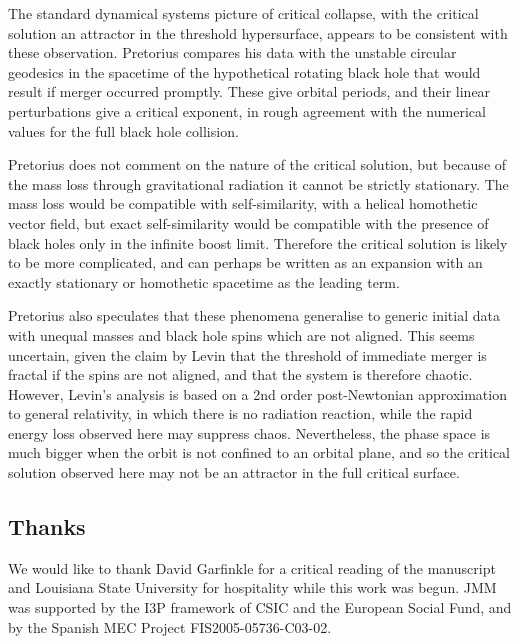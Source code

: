 \documentclass{article}
\begin{document}
The standard dynamical systems picture of critical collapse, with the
critical solution an attractor in the threshold hypersurface, appears
to be consistent with these observation. Pretorius compares his data
with the unstable circular geodesics in the spacetime of the
hypothetical rotating black hole that would result if merger occurred
promptly. These give orbital periods, and their linear perturbations
give a critical exponent, in rough agreement with the numerical values
for the full black hole collision. 

Pretorius does not comment on the nature of the critical solution, but
because of the mass loss through gravitational radiation it cannot be
strictly stationary. The mass loss would be compatible with
self-similarity, with a helical homothetic vector field, but exact
self-similarity would be compatible with the presence of black holes
only in the infinite boost limit. Therefore the critical solution is
likely to be more complicated, and can perhaps be written as an
expansion with an exactly stationary or homothetic spacetime as the
leading term.

Pretorius also
speculates that these phenomena generalise to generic initial data
with unequal masses and black hole spins which are not aligned. This
seems uncertain, given the claim by Levin \cite{Levin} that the
threshold of immediate merger is fractal if the spins are not aligned,
and that the system is therefore chaotic. However, Levin's analysis is
based on a 2nd order post-Newtonian approximation to general
relativity, in which there is no radiation reaction, while the rapid
energy loss observed here may suppress chaos. Nevertheless, the phase
space is much bigger when the orbit is not confined to an orbital
plane, and so the critical solution observed here may not be an attractor
in the full critical surface.


\subsection*{Thanks}

We would like to thank David Garfinkle for a critical reading of the
manuscript and Louisiana State University for hospitality while
this work was begun. JMM was supported by the I3P framework
of CSIC and the European Social Fund, and by the Spanish MEC Project
FIS2005-05736-C03-02.



\end{document}
